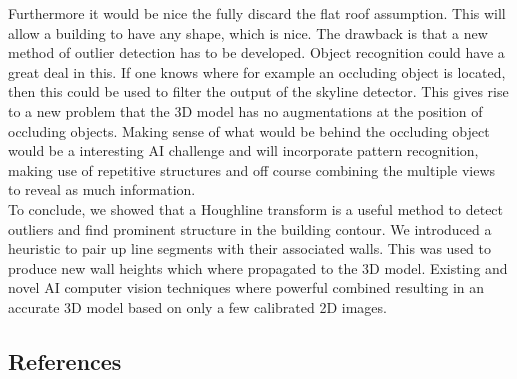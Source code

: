 \documentclass[10pt]{article}
\begin{document}
Furthermore it would be nice the fully discard the flat roof assumption. This will allow a building to have any shape, which is nice. The drawback is that a new method of outlier detection has to be developed. Object recognition could have a great deal in this. If one knows where for example an occluding object is located, then this could be used to filter the output of the skyline detector. This gives rise to a new problem that the 3D model has no augmentations at the position of occluding objects. Making sense of what would be behind the occluding object would be a interesting AI challenge and will incorporate pattern recognition, making use of repetitive structures and off course combining the multiple views to reveal as much information.\\

To conclude, we showed that a Houghline transform is a useful method to detect outliers and find prominent structure in the building contour. We introduced a heuristic to pair up line segments with their associated walls. This was used to produce new wall heights which where propagated to the 3D model.
Existing and novel AI computer vision techniques where powerful combined resulting in an accurate 3D model based on only a few calibrated 2D images. 


\subsection{References}




\end{document}
